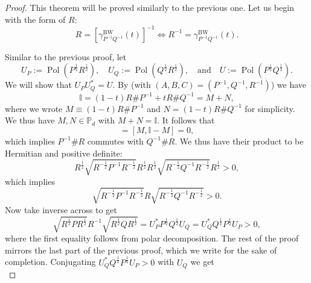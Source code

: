 \documentclass[12pt]{article}
\theoremstyle{definition}
\begin{document}
\begin{proof}
This theorem will be proved similarly to the previous one. Let us begin with the form of $R$:
\begin{equation}
    R = [\gamma^{\mathrm{BW}}_{P^{-1} Q^{-1}}(t)]^{-1} \Longleftrightarrow R ^{-1} = \gamma^{\mathrm{BW}}_{P^{-1} Q^{-1}}(t).
\end{equation}

Similar to the previous proof, let
\begin{equation}
        U_P := \operatorname{Pol}\left(P ^{\frac 12} R ^{\frac 12}\right), \quad U_Q := \operatorname{Pol}\left(Q ^{\frac 12} R ^{\frac 12}\right), \quad \text{and} \quad U := \operatorname{Pol}\left(P ^{\frac 12} Q^{\frac 12}\right).
\end{equation}
We will show that $U_P U_Q^* = U$.  By   (with $(A,B, C) = (P ^{-1} , Q ^{-1} , R ^{-1} )$) we have
\begin{equation}
\mathbb{I} = (1-t) R \# P ^{-1} + t R \# Q ^{-1} = M + N,
\end{equation}
where we wrote $M \equiv (1-t) R \# P ^{-1} $ and $ N = (1-t) R \# Q ^{-1}$ for simplicity. We thus have $M, N \in \mathbb{P}_d$ with $M+ N = \mathbb{I}$. It follows that
\begin{equation}
[M, N] = [M, \mathbb{I} - M] = 0,
\end{equation}
which implies $P ^{-1}  \#R $ commutes with $Q ^{-1} \# R$. We thus have their product to be Hermitian and positive definite:
\begin{equation}
R ^{\frac 12} \sqrt{R ^{-\frac 12} P ^{-1} R ^{-\frac 12}} R ^{\frac 12} R ^{\frac 12} \sqrt{R ^{-\frac 12} Q ^{-1} R ^{-\frac 12}} R ^{\frac 12} > 0,
\end{equation}
which implies
\begin{equation}
\sqrt{R ^{-\frac 12} P ^{-1} R ^{-\frac 12}} R  \sqrt{R ^{-\frac 12} Q ^{-1} R ^{-\frac 12}} > 0.
\end{equation}
Now take inverse across to get
\begin{equation}
\sqrt{R ^{\frac 12} P  R ^{\frac 12}} R ^{-1}   \sqrt{R ^{\frac 12} Q R ^{\frac 12}} = U_P^* P ^{\frac 12} Q ^{\frac 12} U_Q = U_Q^* Q ^{\frac 12} P ^{\frac 12} U_P > 0,
\end{equation}
where the first equality follows from polar decomposition. The rest of the proof mirrors the last part of the previous proof, which we write for the sake of completion.
Conjugating $U_Q^* Q ^{\frac 12} P ^{\frac 12} U_P > 0$ with $U_Q$ we get
\begin{equation}

\end{equation}
\end{proof}
\end{document}
